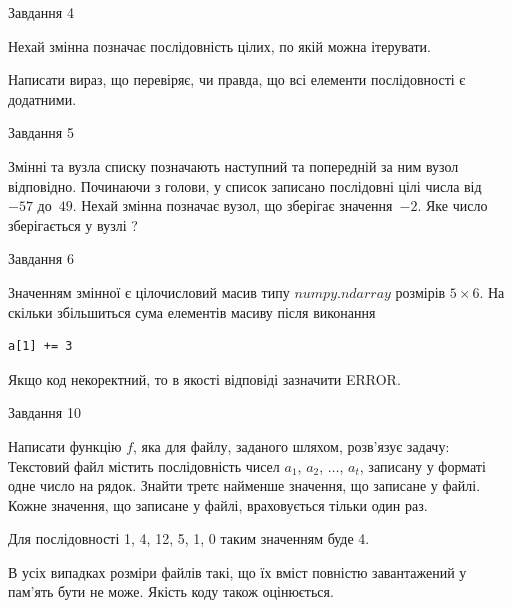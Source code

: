 \documentclass[12pt, ukrainian]{article}
\begin{document}
{               
{\begin{center}Завдання {4}\end{center}}
\vspace{-6mm}
Нехай змінна  позначає послідовність цілих, по якій можна ітерувати.

Написати вираз, що перевіряє, чи правда, що всі елементи послідовності є додатни\-ми.\par

\vspace{10mm}
               
{\begin{center}Завдання {5}\end{center}}
\vspace{-6mm}
Змінні  та  вузла списку позначають наступний та попередній за ним вузол відповідно. Починаючи з голови, у список записано послідовні цілі числа від~$-57$ до~$49$. Нехай змінна  позначає вузол, що зберігає значення~$-2$.
Яке число зберігається у вузлі  ?\par

               
{\begin{center}Завдання {6}\end{center}}
\vspace{-6mm}
Значенням змінної  є цілочисловий масив типу $numpy.ndarray$ розмірів $5{\times}6$. На скільки збільшиться сума елементів масиву  після виконання
\begin{verbatim}
a[1] += 3
\end{verbatim}


Якщо код некоректний, то в якості відповіді зазначити ERROR.\par

               
{\begin{center}Завдання {10}\end{center}}
\vspace{-6mm}

Написати функцію $f$, яка для файлу, заданого шляхом, розв’язує задачу:\\ Текстовий файл містить послідовність чисел $a_1$, $a_2$, $\ldots$, $a_t$, записану у форматі одне число на рядок. Знайти третє найменше значення, що записане у файлі. Кожне значення, що записане у файлі, враховується тільки один раз. \par
Для послідовності 1, 4, 12, 5, 1, 0 таким значенням буде 4.

В усіх випадках розміри файлів такі, що їх вміст повністю завантажений у пам'ять бути не може. Якість коду також оцінюється.



}
\end{document}

